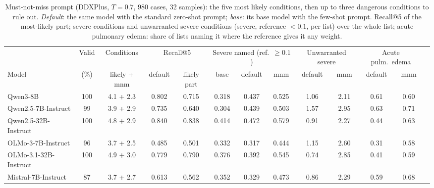 \documentclass[wcp]{jmlr}
\begin{document}
\begin{table}[t]
\centering\small
\begin{adjustbox}{max width=\linewidth}
\begin{tabular}{lcccccccccccc}
\toprule
 & Valid & Conditions & \multicolumn{2}{c}{Recall@5} & \multicolumn{3}{c}{Severe named (ref.\ $\geq 0.1$)} & \multicolumn{2}{c}{Unwarranted severe} & \multicolumn{2}{c}{Acute pulm.\ edema} \\
Model & (\%) & likely + mnm & default & likely part & base & default & mnm & default & mnm & default & mnm \\
\midrule
Qwen3-8B & 100 & 4.1 + 2.3 & 0.802 & 0.715 & 0.318 & 0.437 & 0.525 & 1.06 & 2.11 & 0.61 & 0.60 \\
Qwen2.5-7B-Instruct & 99 & 3.9 + 2.9 & 0.735 & 0.640 & 0.304 & 0.439 & 0.503 & 1.57 & 2.95 & 0.63 & 0.71 \\
Qwen2.5-32B-Instruct & 100 & 4.8 + 2.9 & 0.840 & 0.838 & 0.414 & 0.472 & 0.579 & 0.91 & 2.27 & 0.44 & 0.63 \\
OLMo-3-7B-Instruct & 96 & 3.7 + 2.5 & 0.485 & 0.501 & 0.332 & 0.317 & 0.444 & 1.15 & 2.60 & 0.31 & 0.58 \\
OLMo-3.1-32B-Instruct & 100 & 4.9 + 3.0 & 0.779 & 0.790 & 0.376 & 0.392 & 0.545 & 0.74 & 2.85 & 0.41 & 0.59 \\
Mistral-7B-Instruct & 87 & 3.7 + 2.7 & 0.613 & 0.562 & 0.352 & 0.329 & 0.473 & 0.86 & 2.29 & 0.59 & 0.68 \\
\bottomrule
\end{tabular}
\end{adjustbox}
\caption{Must-not-miss prompt (DDXPlus, $T{=}0.7$, 980 cases, 32 samples): the five most likely conditions, then up to three dangerous conditions to rule out. \emph{Default}: the same model with the standard zero-shot prompt; \emph{base}: its base model with the few-shot prompt. Recall@5 of the most-likely part; severe conditions and unwarranted severe conditions (severe, reference $< 0.1$, per list) over the whole list; acute pulmonary edema: share of lists naming it where the reference gives it any weight.}
\label{tab:mnm}
\end{table}
\end{document}
